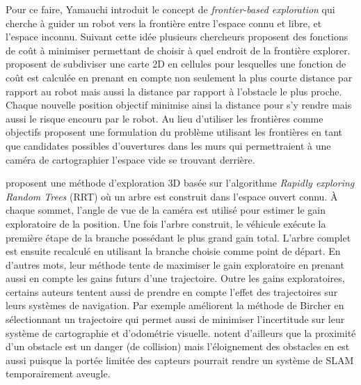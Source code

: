 Pour ce faire, Yamauchi introduit le concept de \textit{frontier-based exploration} qui cherche à guider un robot vers la frontière entre l'espace connu et libre, et l'espace inconnu. Suivant cette idée plusieurs chercheurs proposent des fonctions de coût à minimiser permettant de choisir à quel endroit de la frontière explorer. \citep{Wirth2007} proposent de subdiviser une carte 2D en cellules pour lesquelles une fonction de coût est calculée en prenant en compte non seulement la plus courte distance par rapport au robot mais aussi la distance par rapport à l'obstacle le plus proche. Chaque nouvelle position objectif minimise ainsi la distance pour s'y rendre mais aussi le risque encouru par le robot. Au lieu d'utiliser les frontières comme objectifs \citep{Dornhege2011} proposent une formulation du problème utilisant les frontières en tant que candidates possibles d'ouvertures dans les murs qui permettraient à une caméra de cartographier l'espace vide se trouvant derrière.

\citep{Bircher2016} proposent une méthode d'exploration 3D basée sur l'algorithme \textit{Rapidly exploring Random Trees} (RRT) où un arbre est construit dans l'espace ouvert connu. À chaque sommet, l'angle de vue de la caméra est utilisé pour estimer le gain exploratoire de la position. Une fois l'arbre construit, le véhicule exécute la première étape de la branche possédant le plus grand gain total. L'arbre complet est ensuite recalculé en utilisant la branche choisie comme point de départ. En d'autres mots, leur méthode tente de maximiser le gain exploratoire en prenant aussi en compte les gains futurs d'une trajectoire. Outre les gains exploratoires, certains auteurs tentent aussi de prendre en compte l'effet des trajectoires sur leurs systèmes de navigation. Par exemple \citep{Papachristos2017} améliorent la méthode de Bircher en sélectionnant un trajectoire qui permet aussi de minimiser l'incertitude sur leur système de cartographie et d'odométrie visuelle. \citep{Wirth2007} notent d'ailleurs que la proximité d'un obstacle est un danger (de collision) mais l'éloignement des obstacles en est aussi puisque la portée limitée des capteurs pourrait rendre un système de SLAM temporairement aveugle.

